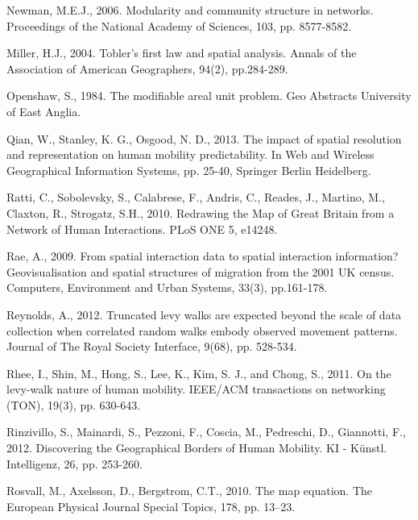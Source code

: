 \documentclass[]{tGIS2e}
\begin{document}
\begin{thebibliography}{9}
Newman, M.E.J., 2006. Modularity and community structure in networks. Proceedings of the National Academy of Sciences, 103, pp. 8577-8582.

Miller, H.J., 2004. Tobler's first law and spatial analysis. Annals of the Association of American Geographers, 94(2), pp.284-289.

Openshaw, S., 1984. The modifiable areal unit problem. Geo Abstracts University of East Anglia.

Qian, W., Stanley, K. G., Osgood, N. D., 2013. The impact of spatial resolution and representation on human mobility predictability. In Web and Wireless Geographical Information Systems,  pp. 25-40, Springer Berlin Heidelberg.

Ratti, C., Sobolevsky, S., Calabrese, F., Andris, C., Reades, J., Martino, M., Claxton, R., Strogatz, S.H., 2010. Redrawing the Map of Great Britain from a Network of Human Interactions. PLoS ONE 5, e14248.

Rae, A., 2009. From spatial interaction data to spatial interaction information? Geovisualisation and spatial structures of migration from the 2001 UK census. Computers, Environment and Urban Systems, 33(3), pp.161-178.

Reynolds, A., 2012. Truncated levy walks are expected beyond the scale of data collection when correlated random walks embody observed movement patterns. Journal of The Royal Society Interface, 9(68), pp. 528-534.

Rhee, I., Shin, M., Hong, S., Lee, K., Kim, S. J., and Chong, S., 2011. On the levy-walk nature of human mobility. IEEE/ACM transactions on networking (TON), 19(3), pp. 630-643.

Rinzivillo, S., Mainardi, S., Pezzoni, F., Coscia, M., Pedreschi, D., Giannotti, F., 2012. Discovering the Geographical Borders of Human Mobility. KI - Künstl. Intelligenz, 26, pp. 253-260.

Rosvall, M., Axelsson, D., Bergstrom, C.T., 2010. The map equation. The European Physical Journal Special Topics, 178, pp. 13–23.


\end{thebibliography}
\end{document}

